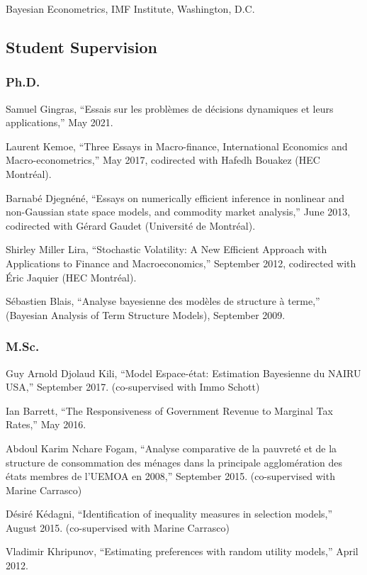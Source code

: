 \documentclass[12pt]{article}
\begin{document}
Bayesian Econometrics, IMF Institute, Washington, D.C.

\subsection*{Student Supervision}

\subsubsection*{Ph.D.}

Samuel Gingras, ``Essais sur les probl\`emes de d\'ecisions dynamiques et leurs applications,''
May 2021.

Laurent Kemoe, ``Three Essays in Macro-finance, International Economics and Macro-econometrics,''
May 2017, codirected with Hafedh Bouakez (HEC Montr\'eal).

Barnab\'e Djegn\'en\'e,
``Essays on numerically efficient inference in nonlinear and non-Gaussian state space models, and commodity market analysis,''
June 2013, codirected with G\'erard Gaudet (Universit\'e de Montr\'eal).

Shirley Miller Lira,
``Stochastic Volatility: A New Efficient Approach with Applications to Finance and Macroeconomics,''
September 2012, codirected with \'Eric Jaquier (HEC Montr\'eal).

S\'ebastien Blais,
``Analyse bayesienne des mod\`eles de structure \`a terme,''
(Bayesian Analysis of Term Structure Models),
September 2009.

\subsubsection*{M.Sc.}

Guy Arnold Djolaud Kili,
``Model Espace-\'etat: Estimation Bayesienne du NAIRU USA,''
September 2017. (co-supervised with Immo Schott)

Ian Barrett,
``The Responsiveness of Government Revenue to Marginal Tax Rates,''
May 2016.

Abdoul Karim Nchare Fogam,
``Analyse comparative de la pauvret\'e et de la structure de consommation des m\'enages dans la principale agglom\'eration des \'etats membres de l’UEMOA en 2008,''
September 2015. (co-supervised with Marine Carrasco)

D\'esir\'e K\'edagni,
``Identification of inequality measures in selection models,''
August 2015. (co-supervised with Marine Carrasco)

Vladimir Khripunov,
``Estimating preferences with random utility models,''
April 2012.
\end{document}
